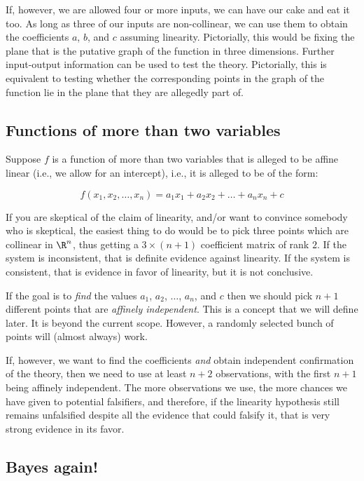 \documentclass[10pt]{amsart}
\begin{document}
If, however, we are allowed four or more inputs, we can have our cake
and eat it too. As long as three of our inputs are non-collinear, we
can use them to obtain the coefficients $a$, $b$, and $c$ assuming
linearity. Pictorially, this would be fixing the plane that is the
putative graph of the function in three dimensions. Further
input-output information can be used to test the theory. Pictorially,
this is equivalent to testing whether the corresponding points in the
graph of the function lie in the plane that they are allegedly part
of.

\subsection{Functions of more than two variables}

Suppose $f$ is a function of more than two variables that is alleged
to be affine linear (i.e., we allow for an intercept), i.e., it is
alleged to be of the form:

$$f(x_1,x_2,\dots,x_n) = a_1x_1 + a_2x_2 + \dots + a_nx_n + c$$

If you are skeptical of the claim of linearity, and/or want to
convince somebody who is skeptical, the easiest thing to do would be
to pick three points which are collinear in $\R^n$, thus getting a $3
\times (n + 1)$ coefficient matrix of rank $2$. If the system is
inconsistent, that is definite evidence against linearity. If the
system is consistent, that is evidence in favor of linearity, but it
is not conclusive.

If the goal is to {\em find} the values $a_1$, $a_2$, $\dots$, $a_n$,
and $c$ then we should pick $n + 1$ different points that are {\em
  affinely independent}. This is a concept that we will define
later. It is beyond the current scope. However, a randomly selected
bunch of points will (almost always) work.

If, however, we want to find the coefficients {\em and} obtain
independent confirmation of the theory, then we need to use at least
$n + 2$ observations, with the first $n + 1$ being affinely
independent. The more observations we use, the more chances we have
given to potential falsifiers, and therefore, if the linearity
hypothesis still remains unfalsified despite all the evidence that
could falsify it, that is very strong evidence in its favor.

\subsection{Bayes again!}
\end{document}
